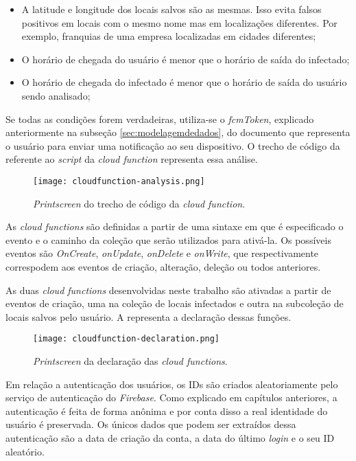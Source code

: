 \begin{itemize}
  \item A latitude e longitude dos locais salvos são as mesmas. Isso evita falsos positivos em locais com o mesmo nome mas em localizações diferentes. Por exemplo, franquias de uma empresa localizadas em cidades diferentes;
  \item O horário de chegada do usuário é menor que o horário de saída do infectado;
  \item O horário de chegada do infectado é menor que o horário de saída do usuário sendo analisado;
\end{itemize}

Se todas as condições forem verdadeiras, utiliza-se o \textit{fcmToken}, explicado anteriormente na subseção \ref{sec:modelagemdedados}, do documento que representa o usuário para enviar uma notificação ao seu dispositivo. O trecho de código da  referente ao \textit{script} da \textit{cloud function} representa essa análise.

\begin{figure}[!htb]
  \centering
  \texttt{[image: cloudfunction-analysis.png]}
  \caption{\textit{Printscreen} do trecho de código da \textit{cloud function}.}
  \label{fig:cfscript}
\end{figure}

As \textit{cloud functions} são definidas a partir de uma sintaxe em que é especificado o evento e o caminho da coleção que serão utilizados para ativá-la. Os possíveis eventos são \textit{OnCreate}, \textit{onUpdate}, \textit{onDelete} e \textit{onWrite}, que respectivamente correspodem aos eventos de criação, alteração, deleção ou todos anteriores.

As duas \textit{cloud functions} desenvolvidas neste trabalho são ativadas a partir de eventos de criação, uma na coleção de locais infectados e outra na subcoleção de locais salvos pelo usuário. A  representa a declaração dessas funções.

\begin{figure}[!htb]
  \centering
  \texttt{[image: cloudfunction-declaration.png]}
  \caption{\textit{Printscreen} da declaração das \textit{cloud functions}.}
  \label{fig:cfdeclaration}
\end{figure}

Em relação a autenticação dos usuários, os IDs são criados aleatoriamente pelo serviço de autenticação do \textit{Firebase}. Como explicado em capítulos anteriores, a autenticação é feita de forma anônima e por conta disso a real identidade do usuário é preservada. Os únicos dados que podem ser extraídos dessa autenticação são a data de criação da conta, a data do último \textit{login} e o seu ID aleatório.

